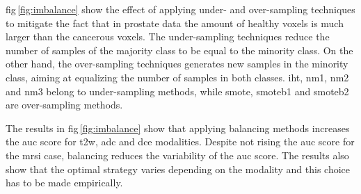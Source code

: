\documentclass[a4paper,num-refs]{wiley-article}
\begin{document}
\Acf{fig}\,\ref{fig:imbalance} show the effect of applying under- and
over-sampling techniques to mitigate the fact that in prostate data the amount
of healthy voxels is much larger than the cancerous voxels.
The under-sampling techniques reduce the number of samples of the majority class
to be equal to the minority class.
On the other hand, the over-sampling techniques generates new samples in the minority class, aiming at equalizing
the number of samples in both classes.
\ac{iht}, \ac{nm1}, \ac{nm2} and \ac{nm3} belong to under-sampling methods,
while \ac{smote}, \ac{smoteb1} and \ac{smoteb2} are over-sampling methods.

The results in \ac{fig}\,\ref{fig:imbalance} show that applying balancing
methods increases the \ac{auc} score for \ac{t2w}, \ac{adc} and \ac{dce}
modalities. Despite not rising the \ac{auc} score for the \ac{mrsi} case,
balancing reduces the variability of the \ac{auc} score. The results also show
that the optimal strategy varies depending on the modality and this choice has
to be made empirically.
\end{document}
